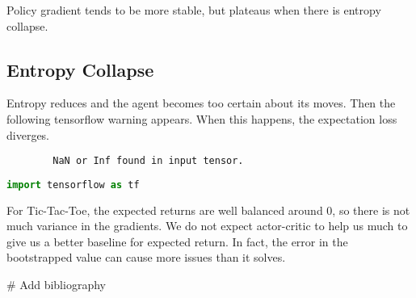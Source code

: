 \documentclass[12pt]{article}
\begin{document}
	Policy gradient tends to be more stable, but plateaus when there is entropy collapse.
	
	\subsection{Entropy Collapse}
	
	Entropy reduces and the agent becomes too certain about its moves. Then the following tensorflow warning appears. When this happens, the expectation loss diverges. 
	
	\begin{lstlisting}
		NaN or Inf found in input tensor.
	\end{lstlisting}
	
	\begin{lstlisting}[language=python]
		import tensorflow as tf
	\end{lstlisting}
	
	For Tic-Tac-Toe, the expected returns are well balanced around 0, so there is not much variance in the gradients. We do not expect actor-critic to help us much to give us a better baseline for expected return. In fact, the error in the bootstrapped value can cause more issues than it solves.
	
	# Add bibliography
	
\end{document}

